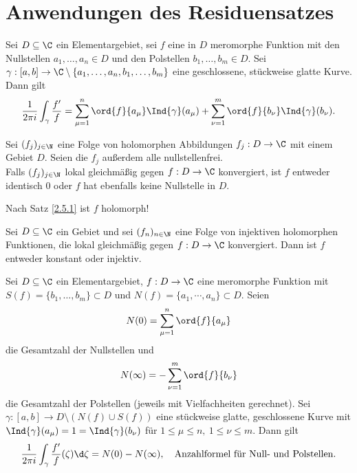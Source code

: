 \section{Anwendungen des Residuensatzes} \lecture
		
		\begin{thm}\label{3.5.1}
			Sei $D \subseteq \C$ ein Elementargebiet, sei $f$ eine in $D$ meromorphe Funktion mit den Nullstellen $ a_1,\dotsc,a_n \in D $ und den Polstellen $ b_1,\dotsc,b_m \in D $. Sei $ \gamma:[a,b] \to \C\setminus\{a_1,\dotsc,a_n,b_1,\dotsc,b_m\} $ eine geschlossene, stückweise glatte Kurve. Dann gilt 
			\[ \frac{1}{2\pi i} \int_\gamma \frac{f'}{f} = \sum_{\mu=1}^n \ord{f}{a_\mu} \Ind{\gamma}(a_\mu) + \sum_{\nu=1}^m \ord{f}{b_\nu} \Ind{\gamma}(b_\nu). \]
		\end{thm}
		
		\begin{thm}[Hurwitz, 1889]
			Sei $ (f_j)_{j \in \N} $ eine Folge von holomorphen Abbildungen $ f_j : D \to \C $ mit einem Gebiet $D$. Seien die $f_j$ außerdem alle nullstellenfrei.\\
			Falls $(f_j)_{j \in \N}$ lokal gleichmäßig gegen $f: D \to \C$ konvergiert, ist $f$ entweder identisch 0 oder $f$ hat ebenfalls keine Nullstelle in $D$.
		\end{thm}
		
		\begin{rem*}
			Nach Satz \ref{2.5.1} ist $f$ holomorph!
		\end{rem*}
		
		\begin{cor}
			Sei $ D \subseteq \C $ ein Gebiet und sei $ (f_n)_{n \in \N} $ eine Folge von injektiven holomorphen Funktionen, die lokal gleichmäßig gegen $f: D \to \C$ konvergiert. Dann ist $f$ entweder konstant oder injektiv.
		\end{cor}
		
		\begin{cor}\label{3.5.4}
			Sei $ D \subseteq \C $ ein Elementargebiet, $f: D \to \C$ eine meromorphe Funktion mit $ S(f) = \{b_1,\dotsc,b_m\} \subset D $ und $ N(f) = \{a_1,\dotsm,a_n\} \subset D $.	Seien 
			$$ N(0) = \sum_{\mu=1}^n \ord{f}{a_\mu} $$
			 die Gesamtzahl der Nullstellen und 
			 $$ N(\infty) = -\sum_{\nu=1}^m \ord{f}{b_\nu} $$
			 die Gesamtzahl der Polstellen (jeweils mit Vielfachheiten gerechnet). Sei $ \gamma: [a,b] \to D\setminus(N(f) \cup S(f)) $ eine stückweise glatte, geschlossene Kurve mit $ \Ind{\gamma}(a_\mu) = 1 = \Ind{\gamma}(b_\nu) $ für $ 1 \leq \mu \leq n,\ 1 \leq \nu \leq  m$. Dann gilt
			\[ \frac{1}{2\pi i} \int_\gamma \frac{f'}{f}(\zeta) \d\zeta = N(0) - N(\infty), \quad \text{Anzahlformel für Null- und Polstellen.} \]
		\end{cor}
		
